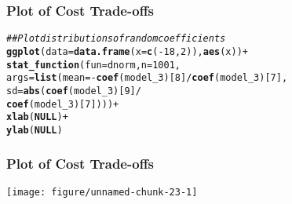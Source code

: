\documentclass{beamer}\usepackage[]{graphicx}\usepackage[]{color}
\makeatletter
\def\maxwidth{ %
  \ifdim\Gin@nat@width>\linewidth
    \linewidth
  \else
    \Gin@nat@width
  \fi
}
\newcommand{\hlnum}[1]{\textcolor[rgb]{0.686,0.059,0.569}{#1}}%
\newcommand{\hlcom}[1]{\textcolor[rgb]{0.678,0.584,0.686}{\textit{#1}}}%
\newcommand{\hlopt}[1]{\textcolor[rgb]{0,0,0}{#1}}%
\newcommand{\hlstd}[1]{\textcolor[rgb]{0.345,0.345,0.345}{#1}}%
\newcommand{\hlkwa}[1]{\textcolor[rgb]{0.161,0.373,0.58}{\textbf{#1}}}%
\newcommand{\hlkwc}[1]{\textcolor[rgb]{0.333,0.667,0.333}{#1}}%
\newcommand{\hlkwd}[1]{\textcolor[rgb]{0.737,0.353,0.396}{\textbf{#1}}}%
\newenvironment{kframe}{%
 \def\at@end@of@kframe{}%
 \ifinner\ifhmode%
  \def\at@end@of@kframe{\end{minipage}}%
  \begin{minipage}{\columnwidth}%
 \fi\fi%
 \def\FrameCommand##1{\hskip\@totalleftmargin \hskip-\fboxsep
 \colorbox{shadecolor}{##1}\hskip-\fboxsep
     \hskip-\linewidth \hskip-\@totalleftmargin \hskip\columnwidth}%
 \MakeFramed {\advance\hsize-\width
   \@totalleftmargin\z@ \linewidth\hsize
   \@setminipage}}%
 {\par\unskip\endMakeFramed%
 \at@end@of@kframe}
\newenvironment{knitrout}{}{} %
\makeatother
\begin{document}
\begin{frame}[fragile]\frametitle{Plot of Cost Trade-offs}
\begin{knitrout}\footnotesize
{}\color{fgcolor}\begin{kframe}
\begin{alltt}
\hlcom{## Plot distributions of random coefficients}
\hlkwd{ggplot}\hlstd{(}\hlkwc{data} \hlstd{=} \hlkwd{data.frame}\hlstd{(}\hlkwc{x} \hlstd{=} \hlkwd{c}\hlstd{(}\hlopt{-}\hlnum{18}\hlstd{,} \hlnum{2}\hlstd{)),} \hlkwd{aes}\hlstd{(x))} \hlopt{+}
  \hlkwd{stat_function}\hlstd{(}\hlkwc{fun} \hlstd{= dnorm,} \hlkwc{n} \hlstd{=} \hlnum{1001}\hlstd{,}
                \hlkwc{args} \hlstd{=} \hlkwd{list}\hlstd{(}\hlkwc{mean} \hlstd{=} \hlopt{-}\hlkwd{coef}\hlstd{(model_3)[}\hlnum{8}\hlstd{]} \hlopt{/} \hlkwd{coef}\hlstd{(model_3)[}\hlnum{7}\hlstd{],}
                            \hlkwc{sd} \hlstd{=} \hlkwd{abs}\hlstd{(}\hlkwd{coef}\hlstd{(model_3)[}\hlnum{9}\hlstd{]} \hlopt{/}
                                       \hlkwd{coef}\hlstd{(model_3)[}\hlnum{7}\hlstd{])))} \hlopt{+}
  \hlkwd{xlab}\hlstd{(}\hlkwa{NULL}\hlstd{)} \hlopt{+}
  \hlkwd{ylab}\hlstd{(}\hlkwa{NULL}\hlstd{)}
\end{alltt}
\end{kframe}
\end{knitrout}
\end{frame}

\begin{frame}[fragile]\frametitle{Plot of Cost Trade-offs}
\begin{knitrout}\footnotesize
{}\color{fgcolor}

{\centering \texttt{[image: figure/unnamed-chunk-23-1]} 

}



\end{knitrout}
\end{frame}
\end{document}
